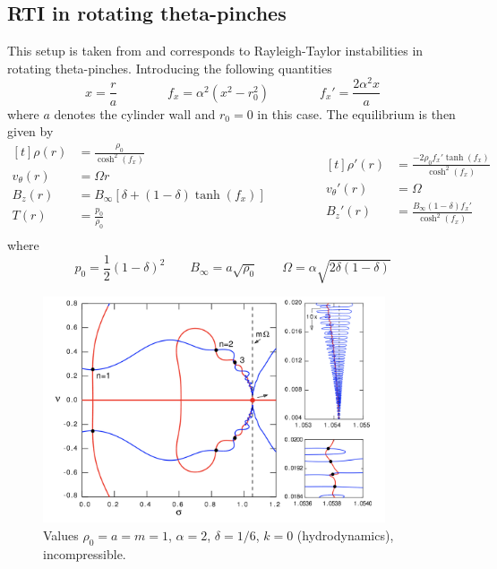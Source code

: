 \documentclass[12pt]{article}
\begin{document}
\subsection{RTI in rotating theta-pinches}
This setup is taken from \citet{goedbloed2018} and corresponds to Rayleigh-Taylor instabilities in rotating theta-pinches.
Introducing the following quantities
\[ x = \frac{r}{a} \qquad\qquad f_x = \alpha^2\left(x^2 - r_0^2\right) \qquad\qquad f_x' = \frac{2\alpha^2 x}{a} \]
where $a$ denotes the cylinder wall and $r_0 = 0$ in this case.
The equilibrium is then given by
\begin{equation*}
	\begin{aligned}[t]
		\rho(r) &= \frac{\rho_0}{\cosh^2(f_x)} \\
		v_\theta(r) &= \Omega r \\
		B_z(r) &= B_\infty\left[\delta + \left(1 - \delta\right)\tanh(f_x)\right] \\
		T(r) &= \frac{p_0}{\rho_0} \\
	\end{aligned}
	\qquad\qquad
	\begin{aligned}[t]
		\rho'(r) &= \frac{-2\rho_0 f_x' \tanh(f_x)}{\cosh^2(f_x)} \\
		v_\theta'(r) &= \Omega \\
		B_z'(r) &= \frac{B_\infty\left(1 - \delta\right)f_x'}{\cosh^2(f_x)}
	\end{aligned}
\end{equation*}
where
\[ p_0 = \frac{1}{2}\left(1 - \delta\right)^2 \qquad B_\infty = a\sqrt{\rho_0} \qquad \Omega = \alpha \sqrt{2\delta(1 - \delta)}\]

\begin{figure}[b!]
	\centering
	\includegraphics[width=0.9\textwidth]{RTI_HD.png}
	\caption{Values $\rho_0 = a = m = 1$, $\alpha = 2$, $\delta = 1/6$, $k = 0$ (hydrodynamics), incompressible.}
\end{figure}
\end{document}
